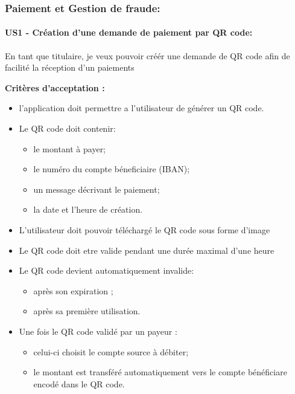 \hypertarget{paiement-et-gestion-de-fraude}{%
\subsubsection{Paiement et Gestion de
fraude:}\label{paiement-et-gestion-de-fraude}}

\hypertarget{us1---cruxe9ation-dune-demande-de-paiement-par-qr-code}{%
\paragraph{US1 - Création d'une demande de paiement par QR
code:}\label{us1---cruxe9ation-dune-demande-de-paiement-par-qr-code}}

En tant que titulaire, je veux pouvoir créér une demande de QR code afin
de facilité la réception d'un paiements

\textbf{Critères d'acceptation :}

\begin{itemize}
\tightlist
\item
  l'application doit permettre a l'utilisateur de générer un QR code.
\item
  Le QR code doit contenir:

  \begin{itemize}
  \tightlist
  \item
    le montant à payer;
  \item
    le numéro du compte béneficiaire (IBAN);
  \item
    un message décrivant le paiement;
  \item
    la date et l'heure de création.
  \end{itemize}
\item
  L'utilisateur doit pouvoir téléchargé le QR code sous forme d'image
\item
  Le QR code doit etre valide pendant une durée maximal d'une heure
\item
  Le QR code devient automatiquement invalide:

  \begin{itemize}
  \tightlist
  \item
    après son expiration ;
  \item
    après sa première utilisation.
  \end{itemize}
\item
  Une fois le QR code validé par un payeur :

  \begin{itemize}
  \tightlist
  \item
    celui-ci choisit le compte source à débiter;
  \item
    le montant est transféré automatiquement vers le compte bénéficiare
    encodé dans le QR code.
  \end{itemize}
\end{itemize}

